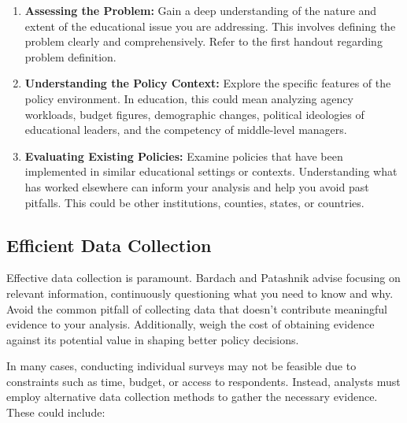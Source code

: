 \documentclass{article}
\theoremstyle{definition}
\theoremstyle{plain}
\begin{document}
\begin{enumerate}[label=\arabic*.]
\item \textbf{Assessing the Problem:} Gain a deep understanding of the nature
and extent of the educational issue you are addressing. This involves defining
the problem clearly and comprehensively. Refer to the first handout regarding
problem definition.
    
    \item \textbf{Understanding the Policy Context:} Explore the specific features of the policy environment. In education, this could mean analyzing agency workloads, budget figures, demographic changes, political ideologies of educational leaders, and the competency of middle-level managers.
    
\item \textbf{Evaluating Existing Policies:} Examine policies that have been
implemented in similar educational settings or contexts. Understanding what has
worked elsewhere can inform your analysis and help you avoid past pitfalls. This
could be other institutions, counties, states, or countries.
\end{enumerate}

\subsection{Efficient Data Collection}

Effective data collection is paramount. Bardach and Patashnik advise focusing on
relevant information, continuously questioning what you need to know and why.
Avoid the common pitfall of collecting data that doesn't contribute meaningful
evidence to your analysis. Additionally, weigh the cost of obtaining evidence
against its potential value in shaping better policy decisions. 

In many cases, conducting individual surveys
may not be feasible due to constraints such as time, budget, or access to
respondents. Instead, analysts must employ alternative data collection methods
to gather the necessary evidence. These could include: 
\end{document}
